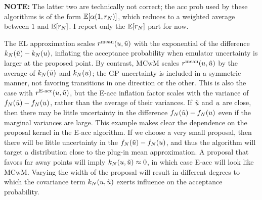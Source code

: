 \documentclass[12pt]{article}
\begin{document}
\textbf{NOTE:} The latter two are technically not correct; the acc prob used by these algorithms
is of the form $\mathbb{E}[\alpha(1, r_N)]$, which reduces to a weighted average between $1$ and 
$\mathbb{E}[r_N]$. I report only the $\mathbb{E}[r_N]$ part for now.

The EL approximation scales $r^{\mathrm{mean}}(u, \tilde{u})$ with the exponential of the difference
$k_{N}(\tilde{u}) - k_{N}(u)$, inflating the acceptance probability when emulator uncertainty is 
larger at the proposed point. By contrast, MCwM scales $r^{\mathrm{mean}}(u, \tilde{u})$ by 
the average of $k_{N}(\tilde{u})$ and $k_{N}(u)$; the GP uncertainty is included in a 
symmetric manner, not favoring transitions in one direction or the other. This is also the case 
with $r^{\textrm{E-acc}}(u, \tilde{u})$, but the E-acc inflation factor scales with the 
variance of $f_{N}(\tilde{u}) - f_{N}(u)$, rather than the average of their variances.
If $\tilde{u}$ and $u$ are close, then there may be little uncertainty in the difference
$f_{N}(\tilde{u}) - f_{N}(u)$ even if the marginal variances are large. This example 
makes clear the dependence on the proposal kernel in the E-acc algorithm. If we choose a 
very small proposal, then there will be little uncertainty in the $f_{N}(\tilde{u}) - f_{N}(u)$,
and thus the algorithm will target a distribution close to the plug-in mean approximation.
A proposal that favors far away points will imply $k_{N}(u, \tilde{u}) \approx 0$, in which 
case E-acc will look like MCwM. Varying the width of the proposal will result in different 
degrees to which the covariance term $k_{N}(u, \tilde{u})$ exerts influence on 
the acceptance probability.
\end{document}
